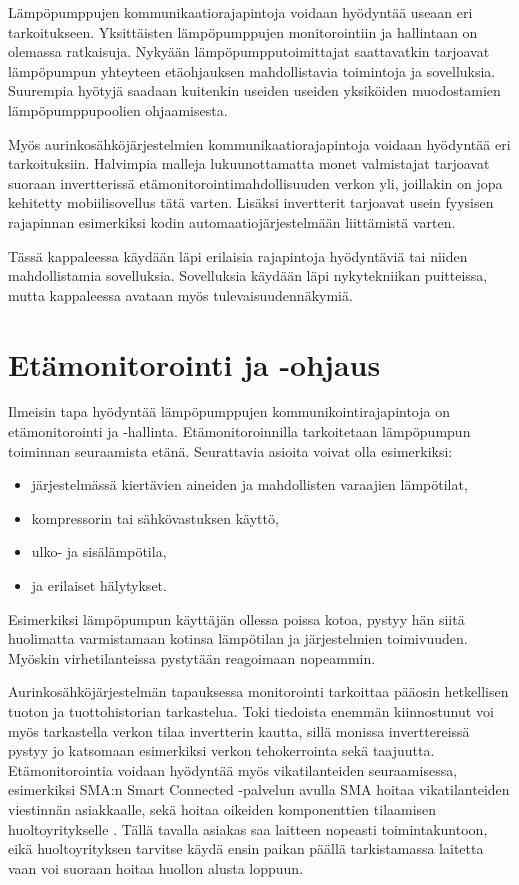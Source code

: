 Lämpöpumppujen kommunikaatiorajapintoja voidaan hyödyntää useaan eri tarkoitukseen. Yksittäisten lämpöpumppujen monitorointiin ja hallintaan on olemassa ratkaisuja. Nykyään lämpöpumpputoimittajat saattavatkin tarjoavat lämpöpumpun yhteyteen etäohjauksen mahdollistavia toimintoja ja sovelluksia. Suurempia hyötyjä saadaan kuitenkin useiden useiden yksiköiden muodostamien lämpöpumppupoolien ohjaamisesta. 

Myös aurinkosähköjärjestelmien kommunikaatiorajapintoja voidaan hyödyntää eri tarkoituksiin. Halvimpia malleja lukuunottamatta monet valmistajat tarjoavat suoraan invertterissä etämonitorointimahdollisuuden verkon yli, joillakin on jopa kehitetty mobiilisovellus tätä varten. Lisäksi invertterit tarjoavat usein fyysisen rajapinnan esimerkiksi kodin automaatiojärjestelmään liittämistä varten. 

Tässä kappaleessa käydään läpi erilaisia rajapintoja hyödyntäviä tai niiden mahdollistamia sovelluksia. Sovelluksia käydään läpi nykytekniikan puitteissa, mutta kappaleessa avataan myös tulevaisuudennäkymiä. 


\section{Etämonitorointi ja -ohjaus}

  Ilmeisin tapa hyödyntää lämpöpumppujen kommunikointirajapintoja on etämonitorointi ja -hallinta. Etämonitoroinnilla tarkoitetaan lämpöpumpun toiminnan seuraamista etänä. Seurattavia asioita voivat olla esimerkiksi:
  \begin{itemize}
    \item järjestelmässä kiertävien aineiden ja mahdollisten varaajien lämpötilat,
    \item kompressorin tai sähkövastuksen käyttö,
    \item ulko- ja sisälämpötila,
    \item ja erilaiset hälytykset.
  \end{itemize} \parencite{Latomaki}
  Esimerkiksi lämpöpumpun käyttäjän ollessa poissa kotoa, pystyy hän siitä huolimatta varmistamaan kotinsa lämpötilan ja järjestelmien toimivuuden. Myöskin virhetilanteissa pystytään reagoimaan nopeammin.

  Aurinkosähköjärjestelmän tapauksessa monitorointi tarkoittaa pääosin hetkellisen tuoton ja tuottohistorian tarkastelua. Toki tiedoista enemmän kiinnostunut voi myös tarkastella verkon tilaa invertterin kautta, sillä monissa inverttereissä pystyy jo katsomaan esimerkiksi verkon tehokerrointa sekä taajuutta. Etämonitorointia voidaan hyödyntää myös vikatilanteiden seuraamisessa, esimerkiksi SMA:n Smart Connected -palvelun avulla SMA hoitaa vikatilanteiden viestinnän asiakkaalle, sekä hoitaa oikeiden komponenttien tilaamisen huoltoyritykselle \parencite{SmartConnected}. Tällä tavalla asiakas saa laitteen nopeasti toimintakuntoon, eikä huoltoyrityksen tarvitse käydä ensin paikan päällä tarkistamassa laitetta vaan voi suoraan hoitaa huollon alusta loppuun. 

